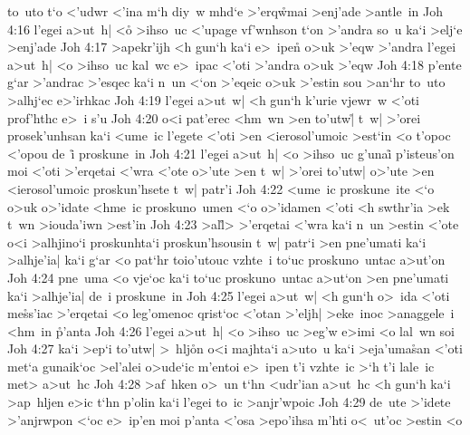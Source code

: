 to~uto
t`o
<'udwr
<'ina
m`h
diy~w
mhd`e
>'erq\r{w}mai
>enj'ade
>antle~in\bibvsend
\vs Joh 4:16
l'egei
a>ut~h|
<o\r{}
>ihso~uc
<'upage
vf'wnhson
t`on
>'andra
so~u
ka`i
>elj`e
>enj'ade\bibvsend
\vs Joh 4:17
>apekr'ijh
<h
gun`h
ka`i
e>~ipe\r{n}
o>uk
>'eqw
>'andra
l'egei
a>ut~h|
<o
>ihso~uc
kal~wc
e>~ipac
<'oti
>'andra
o>uk
>'eqw\bibvsend
\vs Joh 4:18
p'ente
g`ar
>'andrac
>'esqec
ka`i
n~un
<`on
>'eqeic
o>uk
>'estin
sou
>an`hr
to~uto
>alhj`ec
e>'irhkac\bibvsend
\vs Joh 4:19
l'egei
a>ut~w|
<h
gun`h
k'urie
vjewr~w
<'oti
prof'hthc
e>~i
s'u\bibvsend
\vs Joh 4:20
o<i
pat'erec
<hm~wn
>en
to'utw|\r{}
t~w|
>'orei
prosek'unhsan
ka`i
<ume~ic
l'egete
<'oti
>en
<ierosol'umoic
>est`in
<o
t'opoc
<'opou
de~i\r{}
proskune~in\bibvsend
\vs Joh 4:21
l'egei
a>ut~h|
<o
>ihso~uc
g'unai\r{}
p'isteus'on
moi
<'oti
>'erqetai
<'wra
<'ote
o>'ute
>en
t~w|
>'orei
to'utw|
o>'ute
>en
<ierosol'umoic
proskun'hsete
t~w|
patr'i\bibvsend
\vs Joh 4:22
<ume~ic
proskune~ite
<`o
o>uk
o>'idate
<hme~ic
proskuno~umen
<`o
o>'idamen
<'oti
<h
swthr'ia
>ek
t~wn
>iouda'iwn
>est'in\bibvsend
\vs Joh 4:23
>al\r{l}>
>'erqetai
<'wra
ka`i
n~un
>estin
<'ote
o<i
>alhjino`i
proskunhta`i
proskun'hsousin
t~w|
patr`i
>en
pne'umati
ka`i
>alhje'ia|
ka`i
g`ar
<o
pat`hr
toio'utouc
vzhte~i
to`uc
proskuno~untac
a>ut'on\bibvsend
\vs Joh 4:24
pne~uma
<o
vje`oc
ka`i
to`uc
proskuno~untac
a>ut`on
>en
pne'umati
ka`i
>alhje'ia|
de~i
proskune~in\bibvsend
\vs Joh 4:25
l'egei
a>ut~w|
<h
gun`h
o>~ida
<'oti
me\r{s}s'iac
>'erqetai
<o
leg'omenoc
qrist`oc
<'otan
>'eljh|
>eke~inoc
>anaggele~i
<hm~in
\r{p}'anta\bibvsend
{}
\vs Joh 4:26
l'egei
a>ut~h|
<o
>ihso~uc
>eg'w
e>imi
<o
lal~wn
soi\bibvsend
\vs Joh 4:27
ka`i
>ep`i
to'utw|
>~hlj\r{o}n
o<i
majhta`i
a>uto~u
ka`i
>eja'uma\r{s}an
<'oti
met`a
gunaik`oc
>el'alei
o>ude`ic
m'entoi
e>~ipen
t'i
vzhte~ic
>`h
t'i
lale~ic
met>
a>ut~hc\bibvsend
\vs Joh 4:28
>af~hken
o>~un
t`hn
<udr'ian
a>ut~hc
<h
gun`h
ka`i
>ap~hljen
e>ic
t`hn
p'olin
ka`i
l'egei
to~ic
>anjr'wpoic\bibvsend
\vs Joh 4:29
de~ute
>'idete
>'anjrwpon
<`oc
e>~ip'en
moi
p'anta
<'osa
>epo'ihsa
m'hti
o<~ut'oc
>estin
<o
